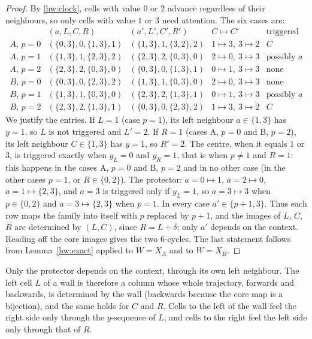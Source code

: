 \begin{proof}
By \eqref{hw:clock}, cells with value $0$ or $2$ advance regardless of their neighbours, so only cells with value $1$ or $3$ need attention. The six cases are:
\[
\begin{array}{ccccl}
 & (a,L,C,R) & (a',L',C',R') & C\mapsto C' & \text{triggered}\\ \hline
A,\,p=0 & (\{0,3\},0,\{1,3\},1) & (\{1,3\},1,\{3,2\},2) & 1\mapsto3,\ 3\mapsto2 & C\\
A,\,p=1 & (\{1,3\},1,\{2,3\},2) & (\{2,3\},2,\{0,3\},0) & 2\mapsto0,\ 3\mapsto3 & \text{possibly }a\\
A,\,p=2 & (\{2,3\},2,\{0,3\},0) & (\{0,3\},0,\{1,3\},1) & 0\mapsto1,\ 3\mapsto3 & \text{none}\\
B,\,p=0 & (\{0,3\},0,\{2,3\},2) & (\{1,3\},1,\{0,3\},0) & 2\mapsto0,\ 3\mapsto3 & \text{none}\\
B,\,p=1 & (\{1,3\},1,\{0,3\},0) & (\{2,3\},2,\{1,3\},1) & 0\mapsto1,\ 3\mapsto3 & \text{possibly }a\\
B,\,p=2 & (\{2,3\},2,\{1,3\},1) & (\{0,3\},0,\{2,3\},2) & 1\mapsto3,\ 3\mapsto2 & C
\end{array}
\]
We justify the entries. If $L=1$ (case $p=1$), its left neighbour $a\in\{1,3\}$ has $y=1$, so $L$ is not triggered and $L'=2$. If $R=1$ (cases A, $p=0$ and B, $p=2$), its left neighbour $C\in\{1,3\}$ has $y=1$, so $R'=2$. The centre, when it equals $1$ or $3$, is triggered exactly when $y_L=0$ and $y_R=1$, that is when $p\ne1$ and $R=1$: this happens in the cases A, $p=0$ and B, $p=2$ and in no other case (in the other cases $p=1$, or $R\in\{0,2\}$). The protector: $a=0\mapsto1$, $a=2\mapsto0$, $a=1\mapsto\{2,3\}$, and $a=3$ is triggered only if $y_L=1$, so $a=3\mapsto3$ when $p\in\{0,2\}$ and $a=3\mapsto\{2,3\}$ when $p=1$. In every case $a'\in\{p+1,3\}$. Thus each row maps the family into itself with $p$ replaced by $p+1$, and the images of $L$, $C$, $R$ are determined by $(L,C)$, since $R=L+\delta$; only $a'$ depends on the context. Reading off the core images gives the two $6$-cycles. The last statement follows from Lemma~\ref{hw:exact} applied to $W=X_A$ and to $W=X_B$.
\end{proof}

Only the protector depends on the context, through its own left neighbour. The left cell $L$ of a wall is therefore a column whose whole trajectory, forwards and backwards, is determined by the wall (backwards because the core map is a bijection), and the same holds for $C$ and $R$. Cells to the left of the wall feel the right side only through the $y$-sequence of $L$, and cells to the right feel the left side only through that of $R$.


